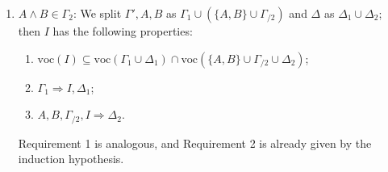 \documentclass[a4paper]{article}
\newcommand{\voc}{\mathrm{voc}}
\begin{document}
\begin{itemize}
\begin{enumerate}
    Requirement 2 is verified by the following derivation:
    \[
      \begin{prooftree}
        \hypo{A,B,\Gamma_{/1} \Rightarrow I,\Delta_1}
        \infer1[L$\wedge$ ($\Gamma_1 = \Gamma_{/1} \cup \{A \wedge B\}$)]{A \wedge B,\Gamma_{/1} \Rightarrow I,\Delta_1}
      \end{prooftree}
    \]
  \item $A \wedge B \in \Gamma_2$: We split $\Gamma',A,B$ as $\Gamma_1 \cup (\{A,B\} \cup \Gamma_{/2})$ and $\Delta$ as $\Delta_1 \cup \Delta_2$; then $I$ has the following properties:
    \begin{enumerate}
    \item $\voc(I) \subseteq \voc(\Gamma_1 \cup \Delta_1) \cap \voc(\{A,B\} \cup \Gamma_{/2} \cup \Delta_2)$;
    \item $\Gamma_1 \Rightarrow I,\Delta_1$;
    \item $A,B,\Gamma_{/2},I \Rightarrow \Delta_2$.
    \end{enumerate}
    Requirement 1 is analogous, and Requirement 2 is already given by the induction hypothesis.


\end{enumerate}
\end{itemize}
\end{document}
